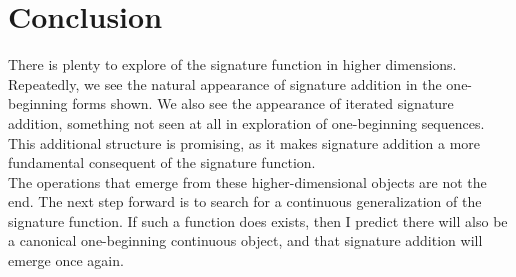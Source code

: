 \documentclass{article}
\begin{document}
\section{Conclusion}

There is plenty to explore of the signature function in higher dimensions. Repeatedly, we see the natural appearance of signature addition in the one-beginning forms shown. We also see the appearance of iterated signature addition, something not seen at all in exploration of one-beginning sequences. This additional structure is promising, as it makes signature addition a more fundamental consequent of the signature function.\\

\noindent The operations that emerge from these higher-dimensional objects are not the end. The next step forward is to search for a continuous generalization of the signature function. If such a function does exists, then I predict there will also be a canonical one-beginning continuous object, and that signature addition will emerge once again.
\end{document}
